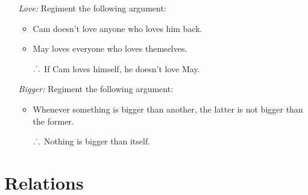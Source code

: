 \documentclass[a4paper, 11pt]{article} %
\def\therefore{\ensuremath{\ldotp\dot{}\,\ldotp}}
\begin{document}
\begin{enumerate}
  \item[\it Love:] Regiment the following argument:
    \begin{itemize}
      \item Cam doesn't love anyone who loves him back.
      \item May loves everyone who loves themselves.
      \item[\therefore] If Cam loves himself, he doesn't love May.
    \end{itemize}
  \item[\it Bigger:] Regiment the following argument:
    \begin{itemize}
      \item Whenever something is bigger than another, the latter is not bigger than the former.
      \item[\therefore] Nothing is bigger than itself.
    \end{itemize}
\end{enumerate}


\section*{Relations}
\end{document}
